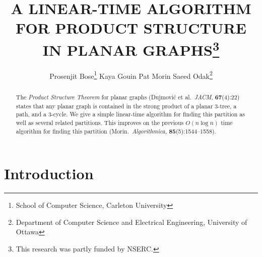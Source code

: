 \documentclass{patmorin}
\title{\MakeUppercase{A Linear-Time Algorithm for Product Structure in Planar Graphs}\thanks{This research was partly funded by NSERC.}}
\author{%
  Prosenjit Bose\thanks{School of Computer Science, Carleton University}\qquad
  Kaya Gouin\footnotemark[1]\qquad
  Pat Morin\footnotemark[1]\qquad
  Saeed Odak\thanks{Department of Computer Science and Electrical Engineering, University of Ottawa}}
\date{}
\begin{document}
\maketitle

\begin{abstract}
  The \emph{Product Structure Theorem} for planar graphs (Dujmović et al.\ \emph{JACM}, \textbf{67}(4):22) states that any planar graph is contained in the strong product of a planar $3$-tree, a path, and a $3$-cycle.  We give a simple linear-time algorithm for finding this partition as well as several related partitions.  This improves on the previous $O(n\log n)$ time algorithm for finding this partition (Morin.\ \emph{Algorithmica}, \textbf{85}(5):1544--1558).
\end{abstract}

%

\section{Introduction}
\end{document}
